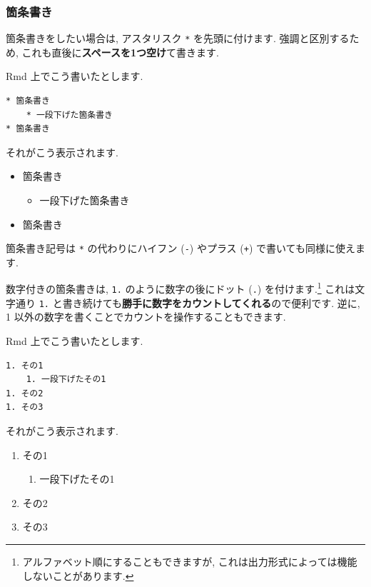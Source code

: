 \documentclass[
]{ltjsarticle}
\providecommand{\tightlist}{%
  \setlength{\itemsep}{0pt}\setlength{\parskip}{0pt}}
\begin{document}
\hypertarget{ux7b87ux6761ux66f8ux304d}{%
\subsubsection{箇条書き}\label{ux7b87ux6761ux66f8ux304d}}

箇条書きをしたい場合は, アスタリスク \texttt{*} を先頭に付けます. 強調と区別するため, これも直後に\textbf{スペースを1つ空け}て書きます.

Rmd 上でこう書いたとします.

\begin{verbatim}
* 箇条書き
    * 一段下げた箇条書き
* 箇条書き
\end{verbatim}

それがこう表示されます.

\begin{itemize}
\tightlist
\item
  箇条書き

  \begin{itemize}
  \tightlist
  \item
    一段下げた箇条書き
  \end{itemize}
\item
  箇条書き
\end{itemize}

箇条書き記号は \texttt{*} の代わりにハイフン (\texttt{-}) やプラス (\texttt{+}) で書いても同様に使えます.

数字付きの箇条書きは, \texttt{1.} のように数字の後にドット (\texttt{.}) を付けます.\footnote{アルファベット順にすることもできますが, これは出力形式によっては機能しないことがあります.} これは文字通り \texttt{1.} と書き続けても\textbf{勝手に数字をカウントしてくれる}ので便利です. 逆に, 1 以外の数字を書くことでカウントを操作することもできます.

Rmd 上でこう書いたとします.

\begin{verbatim}
1. その1
    1. 一段下げたその1
1. その2
1. その3
\end{verbatim}

それがこう表示されます.

\begin{enumerate}
\def\labelenumi{\arabic{enumi}.}
\tightlist
\item
  その1

  \begin{enumerate}
  \def\labelenumii{\arabic{enumii}.}
  \tightlist
  \item
    一段下げたその1
  \end{enumerate}
\item
  その2
\item
  その3
\end{enumerate}
\end{document}
